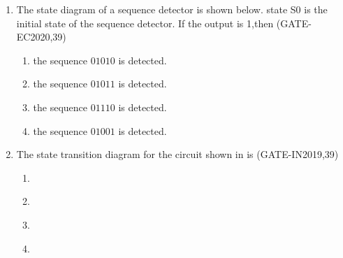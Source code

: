 \begin{enumerate}[label=\arabic*.,ref=\theenumi]
\item The state diagram of a sequence detector is shown below. state S0 is the initial state of the sequence detector. If the output is 1,then
                                        \hfill(GATE-EC2020,39)
	\begin{figure}[H]
    \centering
    \resizebox{\columnwidth}{!}{%
    
	}
    \caption{}
	\label{fig:GATE EC2020,39}
\end{figure}
%    	
\begin{enumerate}
\item   the sequence $01010$ is detected.
\item   the sequence $01011$ is detected.
\item   the sequence $01110$ is detected.
\item   the sequence $01001$ is detected.
\end{enumerate}
%
\item The state transition diagram for the circuit shown in 
	is
                         \hfill(GATE-IN2019,39)
\begin{figure}[H]
\centering
    \resizebox{\columnwidth}{!}{%

	}
    \caption{}
	\label{fig:GATE IN2019,39}
\end{figure}

\begin{enumerate}
\item 
\begin{figure}[H]
\centering
    \resizebox{\columnwidth}{!}{%

	}
    \caption{}
	\label{fig:GATE IN2019,39-1}
\end{figure}
\item 
\begin{figure}[H]
\centering
    \resizebox{\columnwidth}{!}{%

	}
    \caption{}
	\label{fig:GATE IN2019,39-2}
\end{figure}
\item 
\begin{figure}[H]
\centering
    \resizebox{\columnwidth}{!}{%

	}
    \caption{}
	\label{fig:GATE IN2019,39-3}
\end{figure}
\item 
\begin{figure}[H]
\centering
    \resizebox{\columnwidth}{!}{%

	}
    \caption{}
	\label{fig:GATE IN2019,39-4}
\end{figure}


\end{enumerate}
\end{enumerate}
